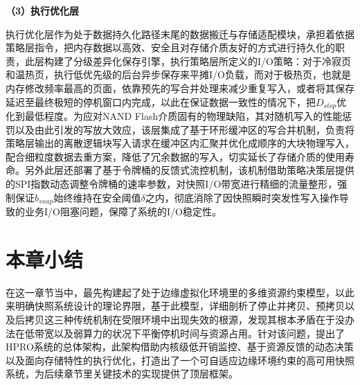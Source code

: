 \textbf{（3）执行优化层}

执行优化层作为处于数据持久化路径末尾的数据搬迁与存储适配模块，承担着依据策略层指令，把内存数据以高效、安全且对存储介质友好的方式进行持久化的职责，此层构建了分级差异化保存引擎，执行策略层所定义的I/O策略：对于冷寂页和温热页，执行低优先级的后台异步保存来平摊I/O负载，而对于极热页，也就是内存修改频率最高的页面，依靠预先的写合并处理来减少重复写入，或者将其保存延迟至最终极短的停机窗口内完成，以此在保证数据一致性的情况下，把$D_{stop}$优化到最低程度。为应对NAND Flash介质固有的物理缺陷，其对随机写入的性能惩罚以及由此引发的写放大效应，该层集成了基于环形缓冲区的写合并机制，负责将策略层输出的离散逻辑块写入请求在缓冲区内汇聚并优化成顺序的大块物理写入，配合细粒度数据去重方案，降低了冗余数据的写入，切实延长了存储介质的使用寿命。另外此层还部署了基于令牌桶的反馈式流控机制，该机制借助策略决策层提供的SPI指数动态调整令牌桶的速率参数，对快照I/O带宽进行精细的流量整形，强制保证$b_{snap}$始终维持在安全阈值$\delta$之内，彻底消除了因快照瞬时突发性写入操作导致的业务I/O阻塞问题，保障了系统的I/O稳定性。

\section{本章小结}

在这一章节当中，最先构建起了处于边缘虚拟化环境里的多维资源约束模型，以此来明确快照系统设计的理论界限，基于此模型，详细剖析了停止并拷贝、预拷贝以及后拷贝这三种传统机制在受限环境中出现失效的根源，发现其根本矛盾在于没办法在低带宽以及弱算力的状况下平衡停机时间与资源占用。针对该问题，提出了HPRO系统的总体架构，此架构借助内核级低开销监控、基于资源反馈的动态决策以及面向存储特性的执行优化，打造出了一个可自适应边缘环境约束的高可用快照系统，为后续章节里关键技术的实现提供了顶层框架。



